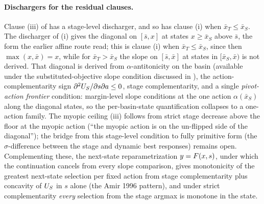 \paragraph{Dischargers for the residual clauses.}
Clause (iii) of  has a stage-level discharger, and
so has clause (i) when $\bar x_T\le\bar x_S$. The discharger of (i) gives the
diagonal on $[\bar s,x]$ at states $x\ge\bar x_S$ above $\bar s$, the form the
earlier affine route read; this is clause (i) when $\bar x_T\le\bar x_S$,
since then $\max(x,\bar x)=x$, while for $\bar x_T>\bar x_S$ the slope on
$[\bar s,\bar x]$ at states in $[\bar x_S,\bar x)$ is not derived. That
diagonal is derived from
$\alpha$-antitonicity on the basin (available under the
substituted-objective slope condition discussed in
), the action-complementarity sign
$\partial^2U_S/\partial s\partial a\le0$, stage complementarity, and
a single \emph{pivot-action frontier} condition: margin-level slope conditions
at the one action $\alpha(\bar x_S)$ along the diagonal states, so
the per-basin-state quantification collapses to a one-action family.
The myopic ceiling (iii) follows from strict stage decrease above the
floor at the myopic action (``the myopic action is on the un-flipped
side of the diagonal''); the bridge from this stage-level condition
to fully primitive form (the $\sigma$-difference between the stage
and dynamic best responses) remains open. Complementing these, the
next-state reparametrization $y=F(x,s)$, under which the
continuation cancels from every slope comparison, gives monotonicity
of the greatest next-state selection per fixed action from stage
complementarity plus concavity of $U_S$ in $s$ alone (the Amir
1996 pattern), and under strict complementarity \emph{every} selection from the stage
argmax is monotone in the state.

